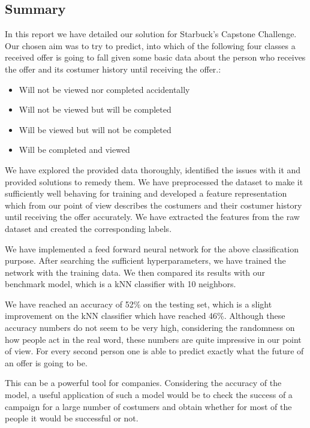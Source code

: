\subsection{Summary}

In this report we have detailed our solution for Starbuck's Capstone Challenge. Our chosen aim was to try to predict, into which of the following four classes a received offer is going to fall given some basic data about the person who receives the offer and its costumer history until receiving the offer.:

\begin{itemize}
	\item Will not be viewed nor completed accidentally
	\item Will not be viewed but will be completed
	\item Will be viewed but will not be completed
	\item Will be completed and viewed
\end{itemize}

We have explored the provided data thoroughly, identified the issues with it and provided solutions to remedy them. We have preprocessed the dataset to make it sufficiently well behaving for training and developed a feature representation which from our point of view describes the costumers and their costumer history until receiving the offer accurately. We have extracted the features from the raw dataset and created the corresponding labels.

We have implemented a feed forward neural network for the above classification purpose. After searching the sufficient hyperparameters, we have trained the network with the training data. We then compared its results with our benchmark model, which is a kNN classifier with 10 neighbors.

We have reached an accuracy of 52\% on the testing set, which is a slight improvement on the kNN classifier which have reached 46\%. Although these accuracy numbers do not seem to be very high, considering the randomness on how people act in the real word, these numbers are quite impressive in our point of view. For every second person one is able to predict exactly what the future of an offer is going to be. 

This can be a powerful tool for companies. Considering the accuracy of the model, a useful application of such a model would be to check the success of a campaign for a large number of costumers and obtain whether for most of the people it would be successful or not. 


